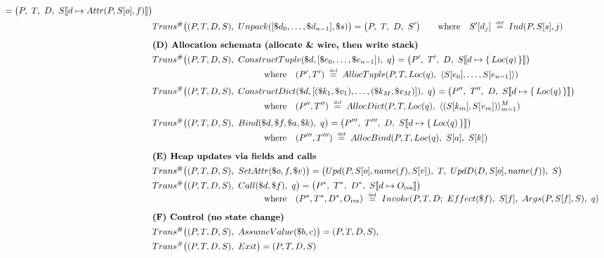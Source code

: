 \begin{figure*}[t]
\begin{align*}
  = \big(P,\ T,\ D,\ S\llbracket d \mapsto Attr(P,S[o],f)\rrbracket\big)
\\
&Trans^\#\big((P,T,D,S),\ Unpack([\$d_0,\ldots,\$d_{n-1}],\$s)\big)
  = \big(P,\ T,\ D,\ S'\big)
\qquad\text{where}\quad
S'[d_j] \;\defeq\; Ind(P,S[s],j)
\\[0.6em]
&\textbf{(D) Allocation schemata (allocate \& wire, then write stack)}\\
&Trans^\#\big((P,T,D,S),\ ConstructTuple(\$d,[\$e_0,\ldots,\$e_{n-1}]),\ q\big)
  = \big(P',\ T',\ D,\ S\llbracket d \mapsto \{\,Loc(q)\,\}\rrbracket\big)
\\[-0.1em]
&\hspace{4.45cm}\text{where}\quad (P',T') \;\defeq\; AllocTuple(P,T,Loc(q),\ \langle S[e_0],\ldots,S[e_{n-1}]\rangle)
\\[0.25em]
&Trans^\#\big((P,T,D,S),\ ConstructDict(\$d,[(\$k_1,\$v_1),\ldots,(\$k_M,\$v_M)]),\ q\big)
  = \big(P'',\ T'',\ D,\ S\llbracket d \mapsto \{\,Loc(q)\,\}\rrbracket\big)
\\[-0.1em]
&\hspace{4.45cm}\text{where}\quad (P'',T'') \;\defeq\; AllocDict(P,T,Loc(q),\ \langle (S[k_m],S[v_m])\rangle_{m=1}^M)
\\[0.25em]
&Trans^\#\big((P,T,D,S),\ Bind(\$d,\$f,\$a,\$k),\ q\big)
  = \big(P''',\ T''',\ D,\ S\llbracket d \mapsto \{\,Loc(q)\,\}\rrbracket\big)
\\[-0.1em]
&\hspace{4.45cm}\text{where}\quad (P''',T''') \;\defeq\; AllocBind(P,T,Loc(q),\ S[a],\ S[k])
\\[0.6em]
&\textbf{(E) Heap updates via fields and calls}\\
&Trans^\#\big((P,T,D,S),\ SetAttr(\$o,f,\$v)\big)
  = \big(Upd(P,S[o],name(f),S[v]),\ T,\ UpdD(D,S[o],name(f)),\ S\big)
\\
&Trans^\#\big((P,T,D,S),\ Call(\$d,\$f),\ q\big)
  = \big(P^\ast,\ T^\ast,\ D^\ast,\ S\llbracket d \mapsto O_{\mathrm{res}}\rrbracket\big)
\\[-0.3em]
&\hspace{4.45cm}\text{where}\quad (P^\ast,T^\ast,D^\ast,O_{\mathrm{res}})\ \defeq\ Invoke(P,T,D;\ Effect(\$f),\ S[f],\ Args(P,S[f],S),\ q)
\\[0.6em]
&\textbf{(F) Control (no state change)}\\
&Trans^\#\big((P,T,D,S),\ AssumeValue(\$b,c)\big)=(P,T,D,S),
\\
&Trans^\#\big((P,T,D,S),\ Exit\big)=(P,T,D,S)
\end{align*}


\end{figure*}

